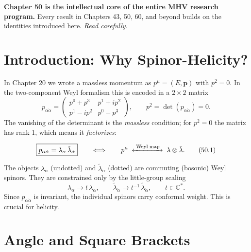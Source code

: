 \begin{mdframed}[backgroundcolor=blue!5]
\textbf{Chapter 50 is the intellectual core of the entire MHV research program.}
Every result in Chapters 43, 50, 60, and beyond builds on the identities
introduced here. \emph{Read carefully.}
\end{mdframed}

\section{Introduction: Why Spinor-Helicity?}

In Chapter 20 we wrote a massless momentum as $p^\mu=(E,\mathbf{p})$ with
$p^2=0$.  In the two-component Weyl formalism this is encoded in a
$2\times2$ matrix
\begin{equation}
p_{\alpha\dot\alpha}
= \begin{pmatrix} p^0+p^3 & p^1+ip^2 \\ p^1-ip^2 & p^0-p^3 \end{pmatrix},
\qquad p^2 = \det(p_{\alpha\dot\alpha}) = 0 .
\end{equation}
The vanishing of the determinant is the \emph{massless} condition; for $p^2=0$
the matrix has rank 1, which means it \emph{factorizes}:

\begin{mdframed}[backgroundcolor=green!5]
\begin{equation}
\boxed{p_{\alpha\dot\alpha}
= \lambda_\alpha\,\tilde\lambda_{\dot\alpha}}
\qquad\Longleftrightarrow\qquad
p^\mu \;\xleftrightarrow{\;\mathrm{Weyl\;map}\;}\;
\lambda\otimes\tilde\lambda .
\tag{50.1}
\end{equation}
\end{mdframed}

The objects $\lambda_\alpha$ (undotted) and $\tilde\lambda_{\dot\alpha}$
(dotted) are commuting (bosonic) Weyl spinors.  They are constrained only by the
little-group scaling
\begin{equation}
\lambda_\alpha\to t\,\lambda_\alpha,\qquad
\tilde\lambda_{\dot\alpha}\to t^{-1}\,\tilde\lambda_{\dot\alpha},
\qquad t\in\mathbb{C}^* .
\tag{50.2}
\end{equation}
Since $p_{\alpha\dot\alpha}$ is invariant, the individual spinors carry
conformal weight.  This is crucial for helicity.

\section{Angle and Square Brackets}\label{sec:brackets}

